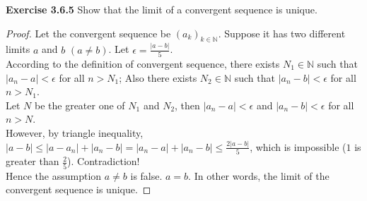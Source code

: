 \documentclass[12pt]{article}
\newcommand{\bbN}{\mathbb{N}}
\theoremstyle{definition}
\numberwithin{equation}{subsection}
\begin{document}
\textbf{Exercise 3.6.5} Show that the limit of a convergent sequence is unique.
\begin{proof}
Let the convergent sequence be $(a_k)_{k\in \bbN}$. 
Suppose it has two different limits $a$ and $b$ $(a \neq b)$.
Let $\epsilon = \frac{|a-b|}{5}$.\\
According to the definition of convergent sequence, there exists $N_1 \in \bbN$ such that 
$|a_n - a| < \epsilon$ for all $n > N_1$; 
Also
there exists $N_2 \in \bbN$ such that 
$|a_n - b| < \epsilon$ for all $n > N_1$.\\
Let $N$ be the greater one of $N_1$ and $N_2$, then 
$|a_n - a| < \epsilon$ and 
$|a_n - b| < \epsilon$ for all $n > N$.\\
However, by triangle inequality, $|a-b| \leq |a-a_n|+|a_n-b| = |a_n-a|+|a_n-b| \leq \frac{2|a-b|}{5}$, which is impossible ($1$ is greater than $\frac{2}{5}$). Contradiction! \\Hence the assumption $a\neq b$ is false. $a=b$. In other words, the limit of the convergent sequence is unique. 
\end{proof}
\end{document}
